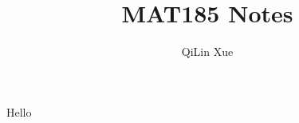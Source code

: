 \documentclass{article}
\title{MAT185 Notes}
\author{QiLin Xue}
\begin{document}
    \maketitle
    \begin{definition}
        Hello
    \end{definition}
\end{document}

